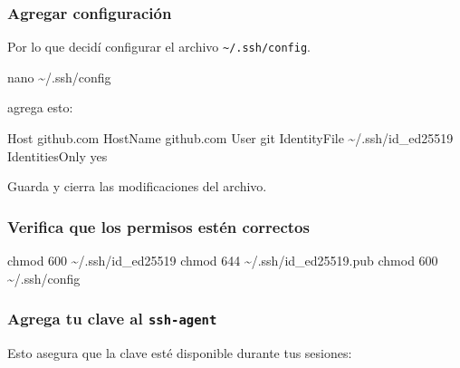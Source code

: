 \documentclass[
  spanish,
  12pt,
  letterpaper,
  DIV=11,
  numbers=noendperiod]{scrreprt}
\newenvironment{Shaded}{\begin{snugshade}}{\end{snugshade}}
\newcommand{\ExtensionTok}[1]{\textcolor[rgb]{0.00,0.23,0.31}{#1}}
\newcommand{\FunctionTok}[1]{\textcolor[rgb]{0.28,0.35,0.67}{#1}}
\newcommand{\NormalTok}[1]{\textcolor[rgb]{0.00,0.23,0.31}{#1}}
\begin{document}
\subsubsection{Agregar configuración}\label{agregar-configuraciuxf3n}

Por lo que decidí configurar el archivo
\texttt{\textasciitilde{}/.ssh/config}.

\begin{Shaded}
\begin{Highlighting}[]
\FunctionTok{nano}\NormalTok{ \textasciitilde{}/.ssh/config}
\end{Highlighting}
\end{Shaded}

agrega esto:

\begin{Shaded}
\begin{Highlighting}[]
\ExtensionTok{Host}\NormalTok{ github.com}
  \ExtensionTok{HostName}\NormalTok{ github.com}
  \ExtensionTok{User}\NormalTok{ git}
  \ExtensionTok{IdentityFile}\NormalTok{ \textasciitilde{}/.ssh/id\_ed25519}
  \ExtensionTok{IdentitiesOnly}\NormalTok{ yes}
\end{Highlighting}
\end{Shaded}

Guarda y cierra las modificaciones del archivo.

\subsubsection{Verifica que los permisos estén
correctos}\label{verifica-que-los-permisos-estuxe9n-correctos}

\begin{Shaded}
\begin{Highlighting}[]
\FunctionTok{chmod}\NormalTok{ 600 \textasciitilde{}/.ssh/id\_ed25519}
\FunctionTok{chmod}\NormalTok{ 644 \textasciitilde{}/.ssh/id\_ed25519.pub}
\FunctionTok{chmod}\NormalTok{ 600 \textasciitilde{}/.ssh/config}
\end{Highlighting}
\end{Shaded}

\subsubsection{\texorpdfstring{\textbf{Agrega tu clave al
\texttt{ssh-agent}}}{Agrega tu clave al ssh-agent}}\label{agrega-tu-clave-al-ssh-agent}

Esto asegura que la clave esté disponible durante tus sesiones:
\end{document}
